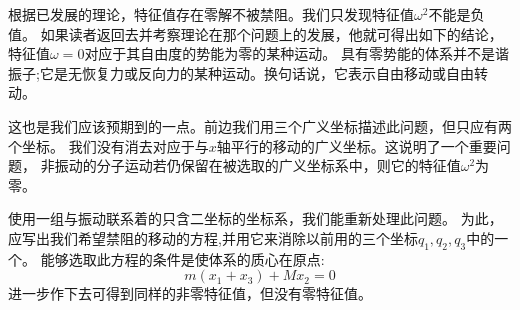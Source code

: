 根据已发展的理论，特征值存在零解不被禁阻。我们只发现特征值$\omega^2$不能是负值。
如果读者返回去并考察理论在那个问题上的发展，他就可得出如下的结论，特征值$\omega=0$对应于其自由度的势能为零的某种运动。
具有零势能的体系并不是谐振子;它是无恢复力或反向力的某种运动。换句话说，它表示自由移动或自由转动。

这也是我们应该预期到的一点。前边我们用三个广义坐标描述此问题，但只应有两个坐标。
我们没有消去对应于与$x$轴平行的移动的广义坐标。这说明了一个重要问题，
非振动的分子运动若仍保留在被选取的广义坐标系中，则它的特征值$\omega^2$为零。

使用一组与振动联系着的只含二坐标的坐标系，我们能重新处理此问题。
为此，应写出我们希望禁阻的移动的方程,并用它来消除以前用的三个坐标$q_1,q_2,q_3$中的一个。
能够选取此方程的条件是使体系的质心在原点:
\[m(x_1+x_3)+Mx_2=0\]
进一步作下去可得到同样的非零特征值，但没有零特征值。

